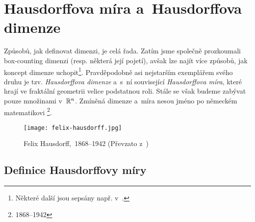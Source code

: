 \section{Hausdorffova míra a~Hausdorffova dimenze}\label{sec:hausdorffova-mira-dimenze}

Způsobů, jak definovat dimenzi, je celá řada. Zatím jsme společně prozkoumali box-counting dimenzi (resp. některá její pojetí), avšak lze najít více způsobů, jak koncept dimenze uchopit\footnote{Některé další jsou sepsány např. v~\citep[str. 40]{Falconer2014}.}. Pravděpodobně asi nejstarším exemplářem svého druhu je tzv. \emph{Hausdorffova dimenze} a~s~ní související \emph{Hausdorffova míra}, které hrají ve fraktální geometrii velice podstatnou roli. Stále se však budeme zabývat pouze množinami v~$\mathbb{R}^n$. Zmíněná dimenze a~míra nesou jméno po německém matematikovi \footnote{1868--1942}.
\begin{figure}[h]
    \centering
    \texttt{[image: felix-hausdorff.jpg]}
    \caption[Felix Hausdorff,~1868--1942]{Felix Hausdorff,~1868--1942 (Převzato z~\cite{OConnorHausdorff2025})}
    \label{fig:felix-hausdorff}
\end{figure}

\subsection{Definice Hausdorffovy míry}\label{subsec:hd-mira-definice}

